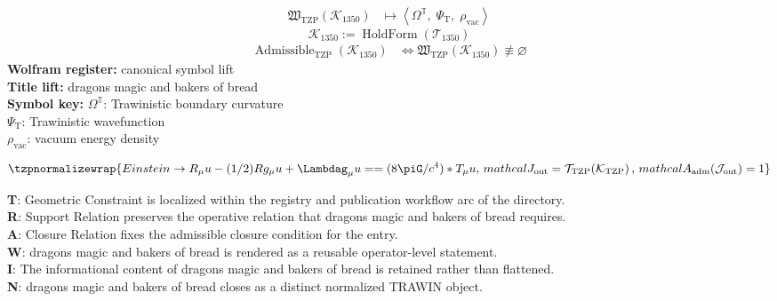 \noindent
\begin{minipage}[t]{0.48\linewidth}
\begingroup
\small
\[
\begin{aligned}
\mathfrak{W}_{\mathrm{TZP}}\!\left(\mathcal{K}_{1350}\right)
&\longmapsto
\left\langle \Omega^{\mathbb{T}},\; \Psi_{\mathrm{T}},\; \rho_{\mathrm{vac}} \right\rangle
\end{aligned}
\]
\[
\mathcal{K}_{1350}
:=
\operatorname{HoldForm}\!\left(\mathcal{T}_{1350}\right)
\]
\[
\begin{aligned}
\operatorname{Admissible}_{\mathrm{TZP}}\!\left(\mathcal{K}_{1350}\right)
&\Longleftrightarrow
\mathfrak{W}_{\mathrm{TZP}}\!\left(\mathcal{K}_{1350}\right)\not\equiv\varnothing
\end{aligned}
\]
\textbf{Wolfram register:} canonical symbol lift\\
\textbf{Title lift:} dragons magic and bakers of bread\\
\textbf{Symbol key:} \(\Omega^{\mathbb{T}}\): Trawinistic boundary curvature\\ \(\Psi_{\mathrm{T}}\): Trawinistic wavefunction\\ \(\rho_{\mathrm{vac}}\): vacuum energy density
\par
\endgroup
\end{minipage}\hfill
\begin{minipage}[t]{0.48\linewidth}
\[
\tzpnormalizewrap{Einstein \to R_\mu u - (1/2)Rg_\mu u + \Lambdag_\mu u == (8\piG/c^4)*T_\mu u,\,mathcal{J}_{\mathrm{out}} = \mathcal{T}_{\mathrm{TZP}}\!\left(\mathcal{K}_{\mathrm{TZP}}\right),\,mathcal{A}_{\mathrm{adm}}\!\left(\mathcal{J}_{\mathrm{out}}\right)=1}
\]

\small
\textbf{T}: Geometric Constraint is localized within the registry and publication workflow arc of the directory.\\
\textbf{R}: Support Relation preserves the operative relation that dragons magic and bakers of bread requires.\\
\textbf{A}: Closure Relation fixes the admissible closure condition for the entry.\\
\textbf{W}: dragons magic and bakers of bread is rendered as a reusable operator-level statement.\\
\textbf{I}: The informational content of dragons magic and bakers of bread is retained rather than flattened.\\
\textbf{N}: dragons magic and bakers of bread closes as a distinct normalized TRAWIN object.
\normalsize
\end{minipage}

